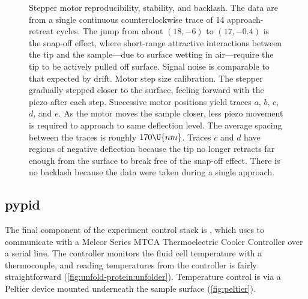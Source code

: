 \begin{figure}
  \begin{center}
    \caption{\protect{} Stepper motor
      reproducibility, stability, and backlash.  The data are from a
      single continuous counterclockwise trace of 14 approach-retreat
      cycles.  The jump from about $(18, -6)$ to $(17, -0.4)$ is the
      snap-off effect, where short-range attractive interactions
      between the tip and the sample---due to surface wetting in
      air---require the tip to be actively pulled off surface.  Signal
      noise is comparable to that expected by drift.
      \protect{} Motor step size
      calibration.  The stepper gradually stepped closer to the
      surface, feeling forward with the piezo after each step.
      Successive motor positions yield traces $a$, $b$, $c$, $d$, and
      $e$.  As the motor moves the sample closer, less piezo movement
      is required to approach to same deflection level.  The average
      spacing between the traces is roughly $170\U{nm}$.  Traces $c$
      and $d$ have regions of negative deflection because the tip no
      longer retracts far enough from the surface to break free of the
      snap-off effect.  There is no backlash because the data were
      taken during a single approach.\label{fig:stepper}}
  \end{center}
\end{figure}

\subsection{pypid}
\label{sec:pyafm:pypid}

The final component of the experiment control stack is \pypid, which
uses  to communicate with a Melcor Series MTCA
Thermoelectric Cooler Controller\citep{melcor} over a serial line.
The controller monitors the fluid cell temperature with a
thermocouple, and reading temperatures from the controller is fairly
straightforward (\cref{fig:unfold-protein:unfolder}).  Temperature
control is via a Peltier device mounted underneath the sample surface
(\cref{fig:peltier}).


